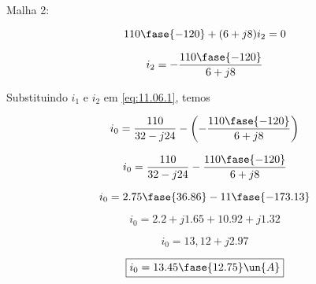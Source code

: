 Malha 2:

\[ 110\fase{-120} + (6 +j8)i_2 = 0 \]

\[ i_2 = - \frac{110\fase{-120}}{6 +j8} \]

Substituindo $i_1$ e $i_2$ em \eqref{eq:11.06.1}, temos   

\[  i_0 =  \frac{110}{32 - j24} - \left(- \frac{110\fase{-120}}{6 +j8}\right)  \]

\[  i_0 =  \frac{110}{32 - j24} - \frac{110\fase{-120}}{6 +j8} \]

\[  i_0 =  2.75\fase{36.86} - 11\fase{-173.13}  \]

\[  i_0 =  2.2 + j1.65 +10.92 + j1.32  \]

\[  i_0 =  13,12 + j2.97 \]

\[ \boxed{i_0 = 13.45\fase{12.75} \un{A}} \]

